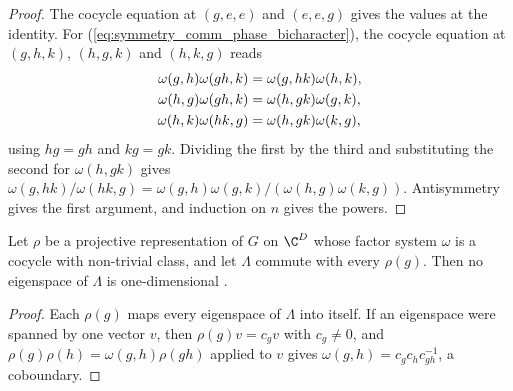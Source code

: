 \begin{proof}\leanok
    The cocycle equation at $(g,e,e)$ and $(e,e,g)$ gives the values at the
    identity. For (\ref{eq:symmetry_comm_phase_bicharacter}), the cocycle
    equation at $(g,h,k)$, $(h,g,k)$ and $(h,k,g)$ reads
    \begin{align}
        \omega(g,h)\omega(gh,k) & =\omega(g,hk)\omega(h,k),
        \notag                                              \\
        \omega(h,g)\omega(gh,k) & =\omega(h,gk)\omega(g,k),
        \notag                                              \\
        \omega(h,k)\omega(hk,g) & =\omega(h,gk)\omega(k,g),
        \notag
    \end{align}
    using $hg=gh$ and $kg=gk$. Dividing the first by the third and
    substituting the second for $\omega(h,gk)$ gives
    $\omega(g,hk)/\omega(hk,g)
        =\omega(g,h)\omega(g,k)/(\omega(h,g)\omega(k,g))$. Antisymmetry gives
    the first argument, and induction on $n$ gives the powers.
\end{proof}

\begin{lemma}
    \label{lem:projective_commutant_eigenspace}
    \leanok
    Let $\rho$ be a projective representation of $G$ on $\C^D$ whose factor
    system $\omega$ is a cocycle with non-trivial class, and let $\Lambda$
    commute with every $\rho(g)$. Then no eigenspace of $\Lambda$ is
    one-dimensional \cite[Section~III.A]{Cirac2021Matrix}.
\end{lemma}

\begin{proof}\leanok
    Each $\rho(g)$ maps every eigenspace of $\Lambda$ into itself.  If an
    eigenspace were spanned by one vector $v$, then $\rho(g)v=c_gv$ with
    $c_g\neq0$, and $\rho(g)\rho(h)=\omega(g,h)\rho(gh)$ applied to $v$ gives
    $\omega(g,h)=c_gc_hc_{gh}^{-1}$, a coboundary.
\end{proof}
